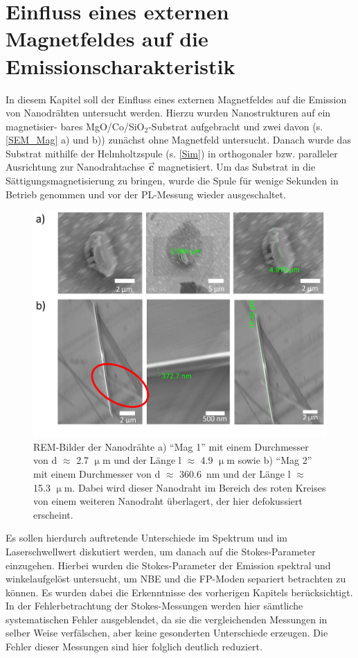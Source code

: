 \chapter{Einfluss eines externen Magnetfeldes auf die Emissionscharakteristik}
In diesem Kapitel soll der Einfluss eines externen Magnetfeldes auf die Emission von Nanodrähten untersucht werden. Hierzu wurden Nanostrukturen auf ein magnetisier- bares MgO/Co/SiO$_\text{2}$-Substrat aufgebracht und zwei davon (s. \autoref{SEM_Mag} a) und b)) zunächst ohne Magnetfeld untersucht. Danach wurde das Substrat mithilfe der Helmholtzspule (s. \autoref{Sim}) in orthogonaler bzw. paralleler Ausrichtung zur Nanodrahtachse $\vec{\textbf{c}}$ magnetisiert. Um das Substrat in die Sättigungsmagnetisierung zu bringen, wurde die Spule für wenige Sekunden in Betrieb genommen und vor der PL-Messung wieder ausgeschaltet.\\
\begin{figure}
\centering
\includegraphics[width=.66\textwidth]{Bilder/Mag/SEM_Mag1}
\caption{REM-Bilder der Nanodrähte a) ``Mag 1'' mit einem Durchmesser von d $\approx$ 2.7 $\upmu$m und der Länge l $\approx$ 4.9 $\upmu$m sowie b) ``Mag 2'' mit einem Durchmesser von d $\approx$ \mbox{360.6 nm} und der Länge l $\approx$ 15.3 $\upmu$m. Dabei wird dieser Nanodraht im Bereich des roten Kreises von einem weiteren Nanodraht überlagert, der hier defokussiert erscheint.}
\label{SEM_Mag}
\end{figure}
Es sollen hierdurch auftretende Unterschiede im Spektrum und im Laserschwellwert diskutiert werden, um danach auf die Stokes-Parameter einzugehen. Hierbei wurden die Stokes-Parameter der Emission spektral und winkelaufgelöst untersucht, um NBE und die FP-Moden separiert betrachten zu können. Es wurden dabei die Erkenntnisse des vorherigen Kapitels berücksichtigt. In der Fehlerbetrachtung der Stokes-Messungen werden hier sämtliche systematischen Fehler ausgeblendet, da sie die vergleichenden Messungen in selber Weise verfälschen, aber keine gesonderten Unterschiede erzeugen. Die Fehler dieser Messungen sind hier folglich deutlich reduziert.\\
